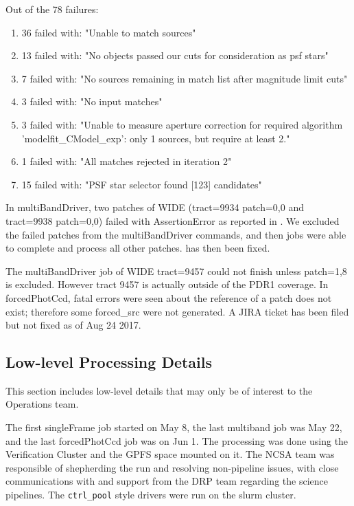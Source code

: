 \documentclass[DM,authoryear,toc]{lsstdoc}
\begin{document}
Out of the 78 failures:
\begin{enumerate}
\item
36 failed with: "Unable to match sources"
\item
13 failed with: "No objects passed our cuts for consideration as psf stars"
\item
7 failed with: "No sources remaining in match list after magnitude limit cuts"
\item
3 failed with: "No input matches"
\item
3 failed with: "Unable to measure aperture correction for required algorithm 'modelfit{\_}CModel{\_}exp': only 1 sources, but require at least 2."
\item
1 failed with: "All matches rejected in iteration 2"
\item
15 failed with: "PSF star selector found [123] candidates"
\end{enumerate}

In multiBandDriver, two patches of WIDE (tract=9934 patch=0,0  and  tract=9938 patch=0,0) failed with AssertionError as reported in . We excluded the failed patches from the multiBandDriver commands, and then jobs were able to complete and process all other patches.  has then been fixed.

The multiBandDriver job of WIDE tract=9457 could not finish unless patch=1,8 is excluded. However tract 9457 is actually outside of the PDR1 coverage.
In forcedPhotCcd, fatal errors were seen about the reference of a patch does not exist; therefore some forced{\_}src were not generated. A JIRA ticket  has been filed but not fixed as of Aug 24 2017.

\subsection{Low-level Processing Details}

This section includes low-level details that may only be of interest to the Operations team.

The first singleFrame job started on May 8, the last multiband job was May 22, and the last forcedPhotCcd job was on Jun 1.  The processing was done using the Verification Cluster and the GPFS space mounted on it. The NCSA team was responsible of shepherding the run and resolving non-pipeline issues, with close communications with and support from the DRP team regarding the science pipelines.  The \texttt{ctrl{\_}pool} style drivers were run on the slurm cluster.
\end{document}
